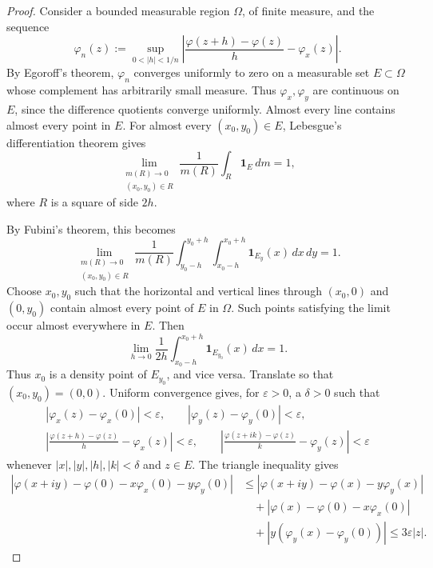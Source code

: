\documentclass[11pt,a4paper]{article}
\begin{document}
\begin{proof}
Consider a bounded measurable region \(\Omega\), of finite measure, and the sequence
\[
\varphi_n(z):=\sup_{0<|h|<1/n}
\left|\frac{\varphi(z+h)-\varphi(z)}h-\varphi_x(z)\right|.
\]
By Egoroff's theorem, \(\varphi_n\) converges uniformly to zero on a measurable set \(E\subset\Omega\) whose complement has arbitrarily small measure. Thus \(\varphi_x,\varphi_y\) are continuous on \(E\), since the difference quotients converge uniformly. Almost every line contains almost every point in \(E\).
For almost every \((x_0,y_0)\in E\), Lebesgue's differentiation theorem gives
\[
\lim_{\substack{m(R)\to0\\(x_0,y_0)\in R}}
\frac1{m(R)}\int_R\mathbf1_E\,dm=1,
\]
where \(R\) is a square of side \(2h\).

By Fubini's theorem, this becomes
\[
\lim_{\substack{m(R)\to0\\(x_0,y_0)\in R}}
\frac1{m(R)}\int_{y_0-h}^{y_0+h}
\int_{x_0-h}^{x_0+h}\mathbf1_{E_y}(x)\,dx\,dy=1.
\]
Choose \(x_0,y_0\) such that the horizontal and vertical lines through \((x_0,0)\) and \((0,y_0)\) contain almost every point of \(E\) in \(\Omega\). Such points satisfying the limit occur almost everywhere in \(E\). Then
\[
\lim_{h\to0}\frac1{2h}\int_{x_0-h}^{x_0+h}
\mathbf1_{E_{y_0}}(x)\,dx=1.
\]
Thus \(x_0\) is a density point of \(E_{y_0}\), and vice versa. Translate so that \((x_0,y_0)=(0,0)\).
Uniform convergence gives, for \(\varepsilon>0\), a \(\delta>0\) such that
\[
\begin{gathered}
|\varphi_x(z)-\varphi_x(0)|<\varepsilon,\qquad
|\varphi_y(z)-\varphi_y(0)|<\varepsilon,\\
\left|\frac{\varphi(z+h)-\varphi(z)}h-\varphi_x(z)\right|<\varepsilon,\qquad
\left|\frac{\varphi(z+ik)-\varphi(z)}k-\varphi_y(z)\right|<\varepsilon
\end{gathered}
\]
whenever \(|x|,|y|,|h|,|k|<\delta\) and \(z\in E\). The triangle inequality gives
\[
\begin{aligned}
|\varphi(x+iy)-\varphi(0)-x\varphi_x(0)-y\varphi_y(0)|
&\le|\varphi(x+iy)-\varphi(x)-y\varphi_y(x)|\\
&\quad+|\varphi(x)-\varphi(0)-x\varphi_x(0)|\\
&\quad+|y(\varphi_y(x)-\varphi_y(0))|
\le3\varepsilon|z|.
\end{aligned}\tag{*}
\]


\end{proof}
\end{document}
